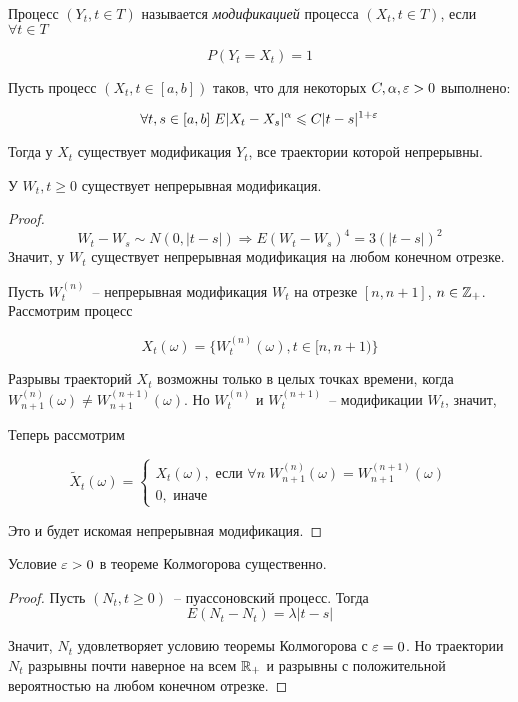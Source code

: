 \begin{definition}
Процесс $(Y_t, t \in T)$ называется \emph{модификацией} процесса $(X_t, t \in T)$, если
$\forall t \in T$

$$P(Y_t = X_t) = 1$$
\end{definition}
\begin{theorem}
Пусть процесс $(X_t, t \in [a,b])$ таков, что для некоторых $C, \alpha, \varepsilon > 0$ выполнено:

$$\forall t, s \in [a,b] \; E|X_t-X_s|^\alpha \leqslant C|t-s|^{1+\varepsilon}$$

Тогда у $X_t$ существует модификация $Y_t$, все траектории которой непрерывны.
\end{theorem}
\begin{corollary}
У $W_t, t \geq 0$ существует непрерывная модификация.
\end{corollary}
\begin{proof}
$$W_t-W_s \sim N(0, |t-s|) \Rightarrow E(W_t-W_s)^4 = 3(|t-s|)^2$$
Значит, у $W_t$ существует непрерывная модификация на любом конечном отрезке.

Пусть $W_t^{(n)}$~-- непрерывная модификация $W_t$ на отрезке $[n, n+1]$, $n \in \mathbb{Z}_+$.
Рассмотрим процесс 

$$X_t(\omega) = \{W_t^{(n)}(\omega), t \in [n, n+1)\}$$

Разрывы траекторий $X_t$ возможны только в целых точках времени, когда $W_{n+1}^{(n)}(\omega) \neq
W_{n+1}^{(n+1)}(\omega)$. Но $W_t^{(n)}$ и $W_t^{(n+1)}$~-- модификации $W_t$, значит,


Теперь рассмотрим 

$$\tilde X_t(\omega) = \left\lbrace
\begin{array}{l}
X_t(\omega), \text{ если } \forall n \; W_{n+1}^{(n)}(\omega) = W_{n+1}^{(n+1)}(\omega) \\
0, \text{ иначе }
\end{array}
\right.
$$

Это и будет искомая непрерывная модификация.
\end{proof}

\begin{remark}
Условие $\varepsilon > 0$ в теореме Колмогорова существенно.
\end{remark}
\begin{proof}
Пусть $(N_t, t \geq 0)$~-- пуассоновский процесс. Тогда
$$E(N_t-N_t) = \lambda|t-s|$$

Значит, $N_t$ удовлетворяет условию теоремы Колмогорова с $\varepsilon = 0$. Но траектории
$N_t$ разрывны почти наверное на всем $\mathbb{R}_+$ и разрывны с положительной вероятностью на любом конечном отрезке.
\end{proof}

